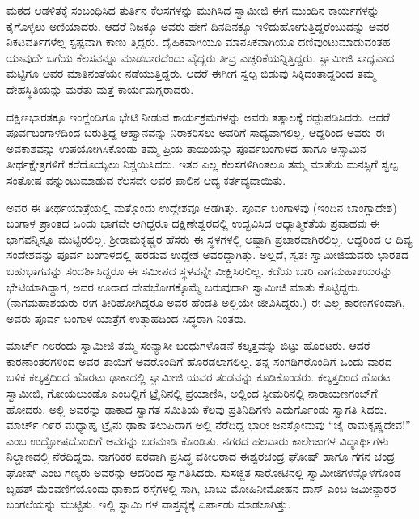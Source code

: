 ಮಠದ ಆಡಳಿತಕ್ಕೆ ಸಂಬಂಧಿಸಿದ ತುರ್ತಿನ ಕೆಲಸಗಳನ್ನು ಮುಗಿಸಿದ ಸ್ವಾಮೀಜಿ ಈಗ ಮುಂದಿನ ಕಾರ್ಯಗಳನ್ನು ಕೈಗೊಳ್ಳಲು ಅಣಿಯಾದರು. ಆದರೆ ನಿಜಕ್ಕೂ ಅವರು ಹೇಗೆ ದಿನದಿನಕ್ಕೂ ಇಳಿದುಹೋಗುತ್ತಿದ್ದರೆಂಬುದನ್ನು ಅವರ ನಿಕಟವರ್ತಿಗಳೆಲ್ಲ ಸ್ಪಷ್ಟವಾಗಿ ಕಾಣು ತ್ತಿದ್ದರು. ದೈಹಿಕವಾಗಿಯೂ ಮಾನಸಿಕವಾಗಿಯೂ ದಣಿವುಂಟುಮಾಡುವಂತಹ ಯಾವುದೇ ಬಗೆಯ ಕೆಲಸವನ್ನೂ ಮಾಡಬಾರದೆಂದು ವೈದ್ಯರು ತೀವ್ರ ಎಚ್ಚರಿಕೆಯನ್ನಿತ್ತಿದ್ದರು. ಸ್ವಾಮೀಜಿ ಸಾಧ್ಯವಾದ ಮಟ್ಟಿಗೂ ಅವರ ಮಾತಿನಂತೆಯೇ ನಡೆಯುತ್ತಿದ್ದರು. ಆದರೆ ಈಗೀಗ ಸ್ವಲ್ಪ ಬಿಡುವು ಸಿಕ್ಕಿದಂತಾದ್ದರಿಂದ ತಮ್ಮ ದೇಹಸ್ಥಿತಿಯನ್ನು ಮರೆತು ಮತ್ತೆ ಕಾರ್ಯಮಗ್ನರಾದರು.

ದಕ್ಷಿಣಭಾರತಕ್ಕೂ ಇಂಗ್ಲೆಂಡಿಗೂ ಭೇಟಿ ನೀಡುವ ಕಾರ್ಯಕ್ರಮಗಳನ್ನು ಅವರು ತತ್ಕಾಲಕ್ಕೆ ರದ್ದುಪಡಿಸಿದರು. ಆದರೆ ಪೂರ್ವಬಂಗಾಳದಿಂದ ಬರುತ್ತಿದ್ದ ಆಹ್ವಾನವನ್ನು ನಿರಾಕರಿಸಲು ಅವರಿಗೆ ಸಾಧ್ಯವಾಗಲಿಲ್ಲ. ಆದ್ದರಿಂದ ಅವರು ಈ ಅವಕಾಶವನ್ನು ಉಪಯೋಗಿಸಿಕೊಂಡು ತಮ್ಮ ಪ್ರಿಯ ತಾಯಿಯನ್ನು ಪೂರ್ವಬಂಗಾಳದ ಹಾಗೂ ಅಸ್ಸಾಮಿನ ತೀರ್ಥಕ್ಷೇತ್ರಗಳಿಗೆ ಕರೆದೊಯ್ಯಲು ನಿಶ್ಚಯಿಸಿದರು. ಇತರ ಎಲ್ಲ ಕೆಲಸಗಳಿಗಿಂತಲೂ ತಮ್ಮ ಮಾತೆಯ ಮನಸ್ಸಿಗೆ ಸ್ವಲ್ಪ ಸಂತೋಷ ವನ್ನುಂಟುಮಾಡುವ ಕೆಲಸವೇ ಅವರ ಪಾಲಿನ ಆದ್ಯ ಕರ್ತವ್ಯವಾಯಿತು.

ಅವರ ಈ ತೀರ್ಥಯಾತ್ರೆಯಲ್ಲಿ ಮತ್ತೊಂದು ಉದ್ದೇಶವೂ ಅಡಗಿತ್ತು. ಪೂರ್ವ ಬಂಗಾಳವು (ಇಂದಿನ ಬಾಂಗ್ಲಾದೇಶ) ಬಂಗಾಳ ಪ್ರಾಂತದ ಒಂದು ಭಾಗವೇ ಆಗಿದ್ದರೂ ದಕ್ಷಿಣೇಶ್ವರದಲ್ಲಿ ಉದ್ಭವಿಸಿದ ಆಧ್ಯಾತ್ಮಿಕತೆಯ ಪ್ರವಾಹವು ಈ ಭಾಗವನ್ನಿನ್ನೂ ಮುಟ್ಟಿರಲಿಲ್ಲ. ಶ್ರೀರಾಮಕೃಷ್ಣರ ಹೆಸರು ಈ ಸ್ಥಳಗಳಲ್ಲಿ ಅಷ್ಟಾಗಿ ಪ್ರಚಾರವಾಗಿರಲಿಲ್ಲ. ಆದ್ದರಿಂದ ಆ ದಿವ್ಯ ಸಂದೇಶವನ್ನು ಪೂರ್ವ ಬಂಗಾಳದಲ್ಲಿ ಹರಡುವ ಉದ್ದೇಶ ಅವರದ್ದಾಗಿತ್ತು. ಅಲ್ಲದೆ, ಸ್ವತಃ ಸ್ವಾಮೀಜಿಯವರು ಭಾರತದ ಬಹುಭಾಗವನ್ನು ಸಂದರ್ಶಿಸಿದ್ದರೂ ಈ ಸಮೀಪದ ಸ್ಥಳವನ್ನೇ ವೀಕ್ಷಿಸಿರಲಿಲ್ಲ. ಕಡೆಯ ಬಾರಿ ನಾಗಮಹಾಶಯರನ್ನು ಭೇಟಿಯಾಗಿದ್ದಾಗ, ಅವರ ಊರಾದ ದೇವಭೋಗಕ್ಕೊಮ್ಮೆ ಬರುವುದಾಗಿ ಸ್ವಾಮೀಜಿ ಮಾತು ಕೊಟ್ಟಿದ್ದರು. (ನಾಗಮಹಾಶಯರು ಈಗ ತೀರಿಹೋಗಿದ್ದರೂ ಅವರ ಹೆಂಡತಿ ಅಲ್ಲಿಯೇ ಜೀವಿಸಿದ್ದರು.) ಈ ಎಲ್ಲ ಕಾರಣಗಳಿಂದಾಗಿ, ಅವರು ಪೂರ್ವ ಬಂಗಾಳ ಯಾತ್ರೆಗೆ ಉತ್ಸಾಹದಿಂದ ಸಿದ್ಧರಾಗಿ ನಿಂತರು.

ಮಾರ್ಚ್ ೧೮ರಂದು ಸ್ವಾಮೀಜಿ ತಮ್ಮ ಸಂನ್ಯಾಸೀ ಬಂಧುಗಳೊಡನೆ ಕಲ್ಕತ್ತವನ್ನು ಬಿಟ್ಟು ಹೊರಟರು. ಆದರೆ ಕಾರಣಾಂತರಗಳಿಂದ ಅವರ ತಾಯಿಗೆ ಅವರೊಂದಿಗೆ ಹೊರಡಲಾಗಲಿಲ್ಲ. ತನ್ನ ಸಂಗಡಿಗರೊಂದಿಗೆ ಒಂದು ವಾರದ ಬಳಿಕ ಕಲ್ಕತ್ತದಿಂದ ಹೊರಟು ಢಾಕಾದಲ್ಲಿ ಸ್ವಾಮೀಜಿ ಯವರ ತಂಡವನ್ನು ಕೂಡಿಕೊಂಡರು. ಕಲ್ಕತ್ತದಿಂದ ಹೊರಟ ಸ್ವಾಮೀಜಿ, ಗೋಯಲುಂಡೊ ಎಂಬಲ್ಲಿಗೆ ಟ್ರೈನಿನಲ್ಲಿ ಪ್ರಯಾಣಿಸಿ, ಅಲ್ಲಿಂದ ಸ್ಟೀಮರಿನಲ್ಲಿ ನಾರಾಯಣಗಂಜ್​ಗೆ ಹೋದರು. ಅಲ್ಲಿ ಅವರನ್ನು ಢಾಕಾದ ಸ್ವಾಗತ ಸಮಿತಿಯ ಕೆಲವು ಪ್ರತಿನಿಧಿಗಳು ಎದುರ್ಗೊಂಡು ಸ್ವಾಗತಿ ಸಿದರು. ಮಾರ್ಚ್ ೧೯ರ ಮಧ್ಯಾಹ್ನ ಟ್ರೈನು ಢಾಕಾ ತಲುಪಿದಾಗ ಅಲ್ಲಿ ನೆರೆದಿದ್ದ ಭಾರೀ ಜನಸ್ತೋಮವು “ಜೈ ರಾಮಕೃಷ್ಣದೇವ!” ಎಂಬ ಉದ್ಘೋಷದೊಂದಿಗೆ ಅವರನ್ನು ಬರಮಾಡಿ ಕೊಂಡಿತು. ನಗರದ ಹಲವಾರು ಕಾಲೇಜುಗಳ ವಿದ್ಯಾರ್ಥಿಗಳು ನಿಲ್ದಾಣದಲ್ಲಿ ನೆರೆದಿದ್ದರು. ನಾಗರಿಕರ ಪರವಾಗಿ ಪ್ರಸಿದ್ಧ ವಕೀಲರಾದ ಈಶ್ವರಚಂದ್ರ ಘೋಷ್ ಹಾಗೂ ಗಗನ ಚಂದ್ರ ಘೋಷ್ ಎಂಬ ಗಣ್ಯರು ಅವರನ್ನು ಆದರಿಂದ ಸ್ವಾಗತಿಸಿದರು. ಸುಸಜ್ಜಿತ ಸಾರೋಟಿನಲ್ಲಿ ಸ್ವಾಮೀಜಿಗಳನ್ನೊಳಗೊಂಡ ಬೃಹತ್ ಮೆರವಣಿಗೆಯೊಂದು ಢಾಕಾದ ರಸ್ತೆಗಳಲ್ಲಿ ಸಾಗಿ, ಬಾಬು ಮೋಹಿನೀಮೋಹನ ದಾಸ್ ಎಂಬ ಜಮೀನ್ದಾರರ ಬಂಗಲೆಯನ್ನು ಮುಟ್ಟಿತು. ಇಲ್ಲಿ ಸ್ವಾಮಿ ಗಳ ವಾಸ್ತವ್ಯಕ್ಕೆ ಏರ್ಪಾಡು ಮಾಡಲಾಗಿತ್ತು.

